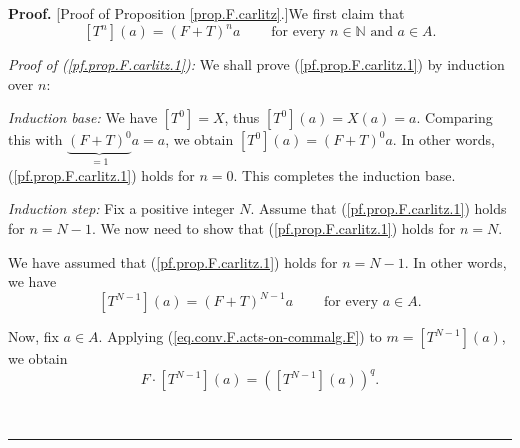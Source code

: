 \documentclass[numbers=enddot,12pt,final,onecolumn,notitlepage]{scrartcl}%
\theoremstyle{definition}
\newenvironment{proof}[1][Proof]{\noindent\textbf{#1.} }{\ \rule{0.5em}{0.5em}}
\begin{document}
\begin{proof}
[Proof of Proposition \ref{prop.F.carlitz}.]We first claim that%
\begin{equation}
\left[  T^{n}\right]  \left(  a\right)  =\left(  F+T\right)  ^{n}%
a\ \ \ \ \ \ \ \ \ \ \text{for every }n\in\mathbb{N}\text{ and }a\in A.
\label{pf.prop.F.carlitz.1}%
\end{equation}


\textit{Proof of (\ref{pf.prop.F.carlitz.1}):} We shall prove
(\ref{pf.prop.F.carlitz.1}) by induction over $n$:

\textit{Induction base:} We have $\left[  T^{0}\right]  =X$, thus $\left[
T^{0}\right]  \left(  a\right)  =X\left(  a\right)  =a$. Comparing this with
$\underbrace{\left(  F+T\right)  ^{0}}_{=1}a=a$, we obtain $\left[
T^{0}\right]  \left(  a\right)  =\left(  F+T\right)  ^{0}a$. In other words,
(\ref{pf.prop.F.carlitz.1}) holds for $n=0$. This completes the induction base.

\textit{Induction step:} Fix a positive integer $N$. Assume that
(\ref{pf.prop.F.carlitz.1}) holds for $n=N-1$. We now need to show that
(\ref{pf.prop.F.carlitz.1}) holds for $n=N$.

We have assumed that (\ref{pf.prop.F.carlitz.1}) holds for $n=N-1$. In other
words, we have%
\begin{equation}
\left[  T^{N-1}\right]  \left(  a\right)  =\left(  F+T\right)  ^{N-1}%
a\ \ \ \ \ \ \ \ \ \ \text{for every }a\in A. \label{pf.prop.F.carlitz.1.pf.1}%
\end{equation}


Now, fix $a\in A$. Applying (\ref{eq.conv.F.acts-on-commalg.F}) to $m=\left[
T^{N-1}\right]  \left(  a\right)  $, we obtain%
\begin{equation}
F\cdot\left[  T^{N-1}\right]  \left(  a\right)  =\left(  \left[
T^{N-1}\right]  \left(  a\right)  \right)  ^{q}.
\label{pf.prop.F.carlitz.1.pf.2}%
\end{equation}



\end{proof}
\end{document}
